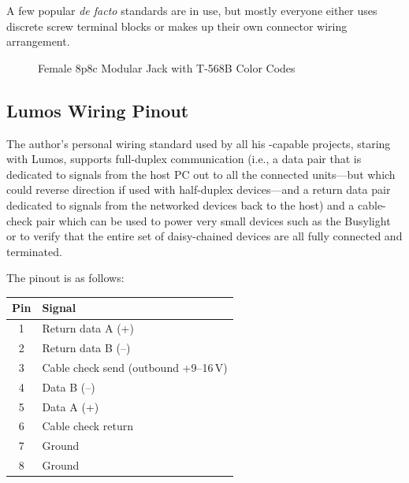 A few popular \emph{de facto} standards are in use, but mostly everyone either uses
discrete screw terminal blocks or makes up their own connector wiring arrangement.
\begin{figure}
\begin{center}
	\caption{Female 8p8c Modular Jack with T-568B Color Codes\label{fig:8p8c}}
\end{center}
\end{figure}

\subsection{Lumos Wiring Pinout}
The author's personal wiring standard used by all his -capable projects, staring with Lumos, supports full-duplex communication (i.e., a data pair that is dedicated
to signals from the host PC out to all the connected units---but which could reverse direction if used with half-duplex devices---and a return data pair dedicated to signals from
the networked devices back to the host) and a cable-check pair which can be used to power very small devices such as the Busylight or to verify that the entire set of daisy-chained
devices are all fully connected and terminated.

The pinout is as follows:
\begin{center}
\begin{tabular}{cl}\toprule
	\bfseries Pin & \bfseries Signal\\\midrule
	1&Return data A (+)\\
	2&Return data B (--)\\
	3&Cable check send (outbound +9--16\,V)\\
	4&Data B (--)\\
	5&Data A (+)\\
	6&Cable check return\\
	7&Ground\\
	8&Ground\\\bottomrule
\end{tabular}
\end{center}

